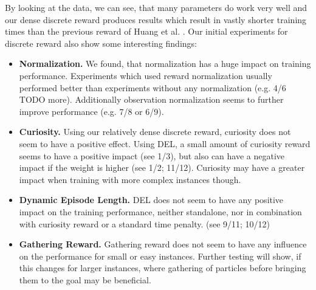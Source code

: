 By looking at the data, we can see, that many parameters do work very well and our dense discrete reward produces results which result in vastly shorter training times than the previous reward of Huang et al. \cite{huang2019}. Our initial experiments for discrete reward also show some interesting findings: 
\begin{itemize}
    \item \textbf{Normalization. } We found, that normalization has a huge impact on training performance. Experiments which used reward normalization usually performed better than experiments without any normalization (e.g. 4/6 TODO more). Additionally observation normalization seems to further improve performance (e.g. 7/8 or 6/9).
    \item \textbf{Curiosity. } Using our relatively dense discrete reward, curiosity does not seem to have a positive effect. Using DEL, a small amount of curiosity reward seems to have a positive impact (see 1/3), but also can have a negative impact if the weight is higher (see 1/2; 11/12). Curiosity may have a greater impact when training with more complex instances though.
    \item \textbf{Dynamic Episode Length. } DEL does not seem to have any positive impact on the training performance, neither standalone, nor in combination with curiosity reward or a standard time penalty. (see 9/11; 10/12)
    \item \textbf{Gathering Reward. } Gathering reward does not seem to have any influence on the performance for small or easy instances. Further testing will show, if this changes for larger instances, where gathering of particles before bringing them to the goal may be beneficial.
\end{itemize}


